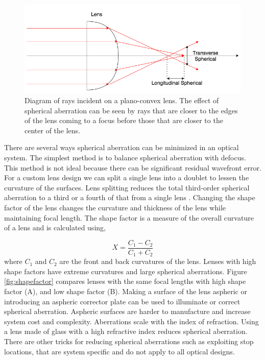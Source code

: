 \begin{figure}
    \centering
    \includegraphics[width=.8\textwidth]{Chapter Materials/Chapter Three Materials/spherical.png}
    \caption{Diagram of rays incident on a plano-convex lens. The effect of spherical aberration can be seen by rays that are closer to the edges of the lens coming to a focus before those that are closer to the center of the lens. }
    \label{fig:spherical}
\end{figure}

There are several ways spherical aberration can be minimized in an optical system. The simplest method is to balance spherical aberration with defocus. This method is not ideal because there can be significant residual wavefront error. For a custom lens design we can split a single lens into a doublet to lessen the curvature of the surfaces. Lens splitting reduces the total third-order spherical aberration to a third or a fourth of that from a single lens \citep{sasianclass}. Changing the shape factor of the lens changes the curvature and thickness of the lens while maintaining focal length. The shape factor is a measure of the overall curvature of a lens and is calculated using,

\begin{equation}
    X=\frac{C_1-C_2}{C_1+C_2}
\end{equation}
\noindent where $C_1$ and $C_2$ are the front and back curvatures of the lens. Lenses with high shape factors have extreme curvatures and large spherical aberrations. Figure \ref{fig:shapefactor} compares lenses with the same focal lengths with high shape factor (A), and low shape factor (B). Making a surface of the lens aspheric or introducing an aspheric corrector plate can be used to illuminate or correct spherical aberration. Aspheric surfaces are harder to manufacture and increase system cost and complexity. Aberrations scale with the index of refraction. Using a lens made of glass with a high refractive index reduces spherical aberration. There are other tricks for reducing spherical aberrations such as exploiting stop locations, that are system specific and do not apply to all optical designs.  

